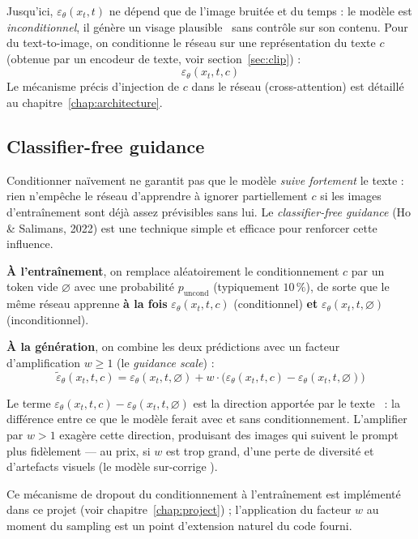 Jusqu'ici, $\varepsilon_\theta(x_t, t)$ ne dépend que de l'image bruitée et du temps : le modèle est
\emph{inconditionnel}, il génère \og un visage plausible \fg\ sans contrôle sur son contenu. Pour du
text-to-image, on conditionne le réseau sur une représentation du texte $c$ (obtenue par un encodeur de
texte, voir section~\ref{sec:clip}) :
\begin{equation}
    \varepsilon_\theta(x_t, t, c)
\end{equation}
Le mécanisme précis d'injection de $c$ dans le réseau (cross-attention) est détaillé au
chapitre~\ref{chap:architecture}.

\subsection{Classifier-free guidance}

Conditionner naïvement ne garantit pas que le modèle \emph{suive fortement} le texte : rien n'empêche
le réseau d'apprendre à ignorer partiellement $c$ si les images d'entraînement sont déjà assez
prévisibles sans lui. Le \emph{classifier-free guidance} (Ho \& Salimans, 2022) \cite{ho2022cfg} est une
technique simple et efficace pour renforcer cette influence.

\textbf{À l'entraînement}, on remplace aléatoirement le conditionnement $c$ par un token vide
$\varnothing$ avec une probabilité $p_{\text{uncond}}$ (typiquement $10\,\%$), de sorte que le même
réseau apprenne \textbf{à la fois} $\varepsilon_\theta(x_t, t, c)$ (conditionnel) \textbf{et}
$\varepsilon_\theta(x_t, t, \varnothing)$ (inconditionnel).

\textbf{À la génération}, on combine les deux prédictions avec un facteur d'amplification
$w \geq 1$ (le \emph{guidance scale}) :
\begin{equation}
    \tilde\varepsilon_\theta(x_t, t, c) = \varepsilon_\theta(x_t, t, \varnothing) + w \cdot \big(\varepsilon_\theta(x_t, t, c) - \varepsilon_\theta(x_t, t, \varnothing)\big)
\end{equation}

\begin{intuition}
Le terme $\varepsilon_\theta(x_t,t,c) - \varepsilon_\theta(x_t,t,\varnothing)$ est la direction
\og apportée par le texte \fg\ : la différence entre ce que le modèle ferait avec et sans
conditionnement. L'amplifier par $w > 1$ exagère cette direction, produisant des images qui suivent le
prompt plus fidèlement — au prix, si $w$ est trop grand, d'une perte de diversité et d'artefacts
visuels (le modèle \og sur-corrige \fg).
\end{intuition}

Ce mécanisme de dropout du conditionnement à l'entraînement est implémenté dans ce projet (voir
chapitre~\ref{chap:project}) ; l'application du facteur $w$ au moment du sampling est un point
d'extension naturel du code fourni.

